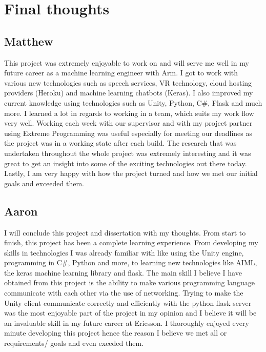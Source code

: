 \section{Final thoughts}
\subsection{Matthew}
This project was extremely enjoyable to work on and will serve me well in my future career as a machine learning engineer with Arm. I got to work with various new technologies such as speech services, VR technology, cloud hosting providers (Heroku) and machine learning chatbots (Keras). I also improved my current knowledge using technologies such as Unity, Python, C\#, Flask and much more. I learned a lot in regards to working in a team, which suits my work flow very well. Working each week with our supervisor and with my project partner using Extreme Programming was useful especially for meeting our deadlines as the project was in a working state after each build. The research that was undertaken throughout the whole project was extremely interesting and it was great to get an insight into some of the exciting technologies out there today. Lastly, I am very happy with how the project turned and how we met our initial goals and exceeded them.

\subsection{Aaron}
I will conclude this project and dissertation with my thoughts. From start to finish, this project has been a complete learning experience. From developing my skills in technologies I was already familiar with like using the Unity engine, programming in C\#, Python and more, to learning new technologies like AIML, the keras machine learning library and flask. The main skill I believe I have obtained from this project is the ability to make various programming language communicate with each other via the use of networking. Trying to make the Unity client communicate correctly and efficiently with the python flask server was the most enjoyable part of the project in my opinion and I believe it will be an invaluable skill in my future career at Ericsson. I thoroughly enjoyed every minute developing this project hence the reason I believe we met all or requirements/ goals and even exeeded them.